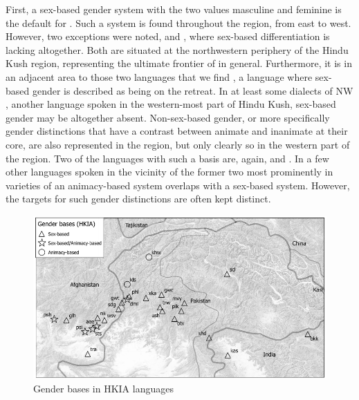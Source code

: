 \documentclass[output=collectionpaper]{langsci/langscibook}
\begin{document}
First, a sex-based gender system with the two values masculine and feminine is the default for . Such a system is found throughout the region, from east to west. However, two exceptions were noted,  and , where sex-based differentiation is lacking altogether. Both are situated at the northwestern periphery of the Hindu Kush region, representing the ultimate frontier of  in general. Furthermore, it is in an adjacent area to those two languages that we find , a language where sex-based gender is described as being on the retreat. In at least some dialects of NW , another language spoken in the western-most part of Hindu Kush, sex-based gender may be altogether absent. Non-sex-based gender, or more specifically gender distinctions that have a contrast between animate and inanimate at their core, are also represented in the region, but only clearly so in the western part of the region. Two of the languages with such a basis are, again,  and . In a few other languages spoken in the vicinity of the former two \textendash{} most prominently in varieties of  \textendash{} an animacy-based system overlaps with a sex-based system. However, the targets for such gender distinctions are often kept distinct.

\begin{figure}[htb]
\includegraphics[width=\textwidth]{figures/10/map2_2}
\caption{Gender bases in HKIA languages}
\label{fig:Lilje:2}
\end{figure}
\end{document}
